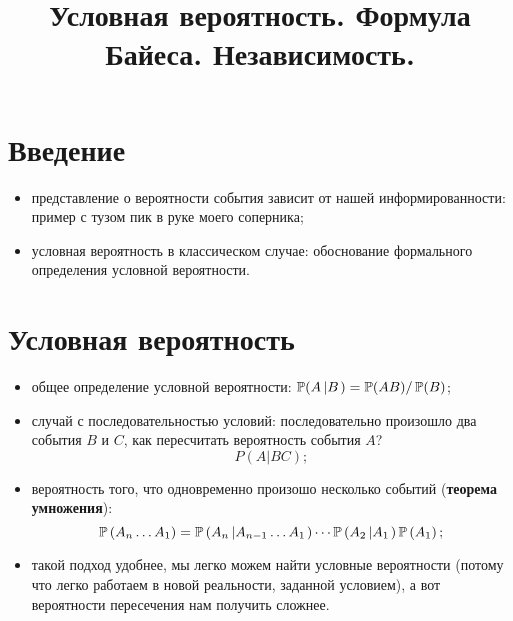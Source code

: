 

\title{Условная вероятность. Формула Байеса. Независимость.} 
\date{\vspace{-1cm}}


\maketitle

\section*{Введение}
\begin{itemize}
    \item
    представление о вероятности события зависит от нашей информированности: пример с тузом пик в руке моего соперника;
    \item
    условная вероятность в классическом случае: обоснование формального определения условной вероятности.
\end{itemize}

\section*{Условная вероятность}
\begin{itemize}
    \item
    общее определение условной вероятности: $\operatorname{\mathbb{P}}(A \left| B\right.) = \operatorname{\mathbb{P}}(AB) / \operatorname{\mathbb{P}}(B)$;
    \item
    случай с последовательностью условий: последовательно произошло два события $B$ и $C$, как пересчитать вероятность события $A$?
    \[
        P(A \left| BC\right.);
    \]
    \item
        вероятность того, что одновременно произошо несколько событий (\textbf{теорема умножения}):
    \[
        \operatorname{\mathbb{P}}\left(A_n \ldots A_1\right) = \operatorname{\mathbb{P}}\left(A_n\left|A_{n - 1} \ldots A_1\right.\right)\cdots\operatorname{\mathbb{P}}\left(A_2\left|A_1\right.\right) \operatorname{\mathbb{P}}\left(A_1\right);
    \]
    \item
    такой подход удобнее, мы легко можем найти условные вероятности (потому что легко работаем в новой реальности, заданной условием), а вот вероятности пересечения нам получить сложнее.
\end{itemize}

